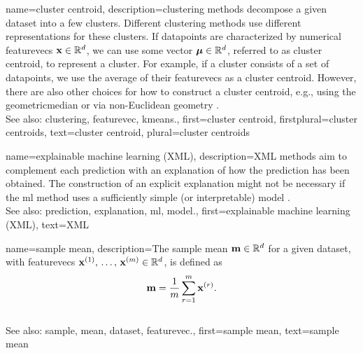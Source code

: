 {name={cluster centroid}, 
	description={\Gls{clustering} methods decompose a given 
		\gls{dataset} into a few \glspl{cluster}. Different \gls{clustering} methods use 
		different representations for these \glspl{cluster}. If \glspl{datapoint} are 
		characterized by numerical \glspl{featurevec} ${\bf x} \in \mathbb{R}^{d}$, 
		we can use some \gls{vector} ${\bm \mu} \in \mathbb{R}^{d}$, referred to 
		as \gls{cluster} centroid, to represent a \gls{cluster}. For example, if a \gls{cluster} 
		consists of a set of \glspl{datapoint}, we use the average of their \glspl{featurevec} 
		as a \gls{cluster} centroid. However, there are also other choices for how to construct 
		a \gls{cluster} centroid, e.g., using the \gls{geometricmedian} \cite{PARK20093336} 
		or via non-Euclidean geometry \cite{JMLR:v6:banerjee05b}.
		\\
		See also: \gls{clustering}, \gls{featurevec}, \gls{kmeans}.},
	first={cluster centroid},
	firstplural={cluster centroids}, 
	text={cluster centroid}, 
	plural={cluster centroids}
}

{name={explainable machine learning (XML)}, 
	description={XML 
		methods aim to complement each \gls{prediction} with an \gls{explanation} of 
		how the \gls{prediction} has been obtained. The construction of an explicit \gls{explanation} 
		might not be necessary if the \gls{ml} method uses a sufficiently simple (or interpretable) \gls{model} \cite{rudin2019stop}.
				\\
		See also: \gls{prediction}, \gls{explanation}, \gls{ml}, \gls{model}.},
	first={explainable machine learning (XML)},
	text={XML} 
}
	
{name={sample mean}, 
	description={The \gls{sample} \gls{mean} 
		${\bf m} \in \mathbb{R}^{d}$ for a given \gls{dataset}, with \glspl{featurevec} 
		${\bf x}^{(1)}, \,\ldots, \,{\bf x}^{(m)} \in \mathbb{R}^{d}$, is defined as 
		$${\bf m} = \frac{1}{m} \sum_{r=1}^{m} {\bf x}^{(r)}.$$ 
					\\
		See also: \gls{sample}, \gls{mean}, \gls{dataset}, \gls{featurevec}.},
	first={sample mean},
	text={sample mean} 
}
	
